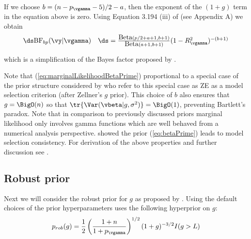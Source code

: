 \noindent If we choose 
$b = (n - p_\vgamma - 5)/2 - a$, then the exponent of the $(1 + g)$ term in the equation above is zero.
Using Equation 3.194 (iii) of \cite{Gradshteyn1988}
(see Appendix A) we obtain
\begin{equation}\label{eq:marginalLikelihoodBetaPrime}
\begin{array}{rl}
\ds \mbox{BF}_{bp}(\vy|\vgamma) 
& \ds 
=   
\frac{\mbox{Beta}(p/2 + a + 1,b + 1)}{\mbox{Beta}(a+1,b+1)} (1-R_\vgamma^2)^{-(b + 1)}
%
\end{array}
\end{equation}

\noindent which is a simplification of the Bayes factor proposed by
\cite{Maruyama2011}.


Note that (\ref{eq:marginalLikelihoodBetaPrime}) proportional
to a special case of the prior structure considered by \cite{Maruyama2011}
who refer to this special case as ZE as a model selection criterion (after Zellner's $g$ prior). This choice of $b$ also ensures that $g = \BigO(n)$ so that $\tr\{\Var(\vbeta | g, \sigma^2)\} = \BigO(1)$, preventing Bartlett's paradox. 
Note that in comparison to previously discussed priors
marginal likelihood only involves gamma functions which
are well behaved from a numerical analysis perspective. 
\cite{Maruyama2011} showed the prior (\ref{eq:betaPrime}) leads to model
selection consistency.
For derivation of the above properties and further discussion see \cite{Maruyama2011}.


\subsection{Robust prior}  

Next we will consider the robust prior for $g$ as proposed by \cite{Bayarri2012}. Using the default
choices of the prior hyperparameters \cite{Bayarri2012} uses the following hyperprior on $g$:
\begin{equation}\label{eq:robustPrior}
p_{{rob}}(g) = \frac{1}{2}\left(\frac{1+n}{1 + p_\vgamma}  \right)^{1/2} (1 + g)^{-3/2}I(g > L)
\end{equation}
 
